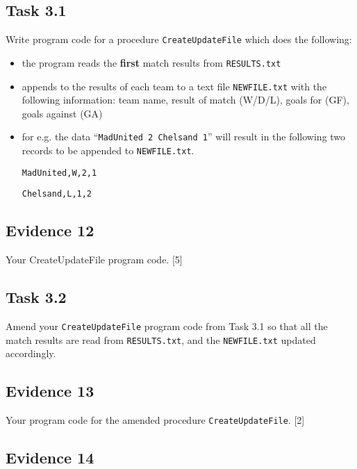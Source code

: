 \subsection*{Task 3.1 }

Write program code for a procedure \texttt{CreateUpdateFile} which
does the following: 
\begin{itemize}
\item the program reads the \textbf{first} match results from \texttt{RESULTS.txt}
\item appends to the results of each team to a text file \texttt{NEWFILE.txt}
with the following information: team name, result of match (W/D/L),
goals for (GF), goals against (GA)
\item for e.g. the data \textquotedblleft \texttt{MadUnited 2 Chelsand 1}\textquotedblright{}
will result in the following two records to be appended to \texttt{NEWFILE.txt}.

\noindent\begin{minipage}[t]{1\columnwidth}%
\texttt{MadUnited,W,2,1}

\texttt{Chelsand,L,1,2}%
\end{minipage}
\end{itemize}

\subsection*{Evidence 12 }

Your CreateUpdateFile program code. \hfill{}{[}5{]}

\subsection*{Task 3.2 }

Amend your \texttt{CreateUpdateFile} program code from Task 3.1 so
that all the match results are read from \texttt{RESULTS.txt}, and
the \texttt{NEWFILE.txt} updated accordingly. 

\subsection*{Evidence 13 }

Your program code for the amended procedure \texttt{CreateUpdateFile}.
\hfill{}{[}2{]}

\subsection*{Evidence 14 }

